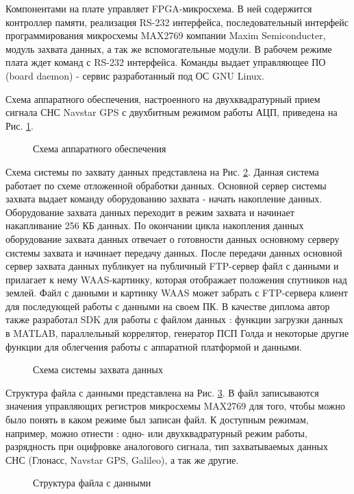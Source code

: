 Компонентами на плате управляет FPGA-микросхема. В ней содержится контроллер памяти, реализация RS-232 интерфейса, последовательный интерфейс программирования микросхемы
MAX2769 компании Maxim Semiconducter, модуль захвата данных, а так же вспомогательные модули. В рабочем режиме плата ждет команд с RS-232 интерфейса.
Команды выдает управляющее ПО (board daemon) - сервис разработанный под ОС GNU Linux.

Схема аппаратного обеспечения, настроенного на двухквадратурный прием сигнала СНС Navstar GPS с двухбитным режимом работы АЦП, приведена на Рис. \ref{pic:board_scheme}.
\begin{figure}[h]
	\center{}
	\caption{Схема аппаратного обеспечения}
	\label{pic:board_scheme}
\end{figure}

Схема системы по захвату данных представлена на Рис. \ref{pic:gps_acq_system_scheme}. Данная система работает по схеме отложенной обработки данных. Основной сервер системы захвата
выдает команду оборудованию захвата - начать накопление данных. Оборудование захвата данных переходит в режим захвата и начинает накапливание 256 КБ данных. По окончании цикла
накопления данных оборудование захвата данных отвечает о готовности данных основному серверу системы захвата и начинает передачу данных. После передачи данных основной сервер
захвата данных публикует на публичный FTP-сервер файл с данными и прилагает к нему WAAS-картинку, которая отображает положения спутников над землей. Файл с данными
и картинку WAAS может забрать с FTP-сервера клиент для последующей работы с данными на своем ПК. В качестве диплома автор также разработал SDK для работы с файлом данных
\cite{github-gpsproject}: функции загрузки данных в MATLAB, параллельный коррелятор, генератор ПСП Голда и некоторые другие функции для облегчения работы с аппаратной платформой
и данными.

\begin{figure}[h]
	\center{}
	\caption{Схема системы захвата данных}
	\label{pic:gps_acq_system_scheme}
\end{figure}

Структура файла с данными представлена на Рис. \ref{pic:dump_file}. В файл записываются значения управляющих регистров микросхемы MAX2769 для того, чтобы можно было
понять в каком режиме был записан файл. К доступным режимам, например, можно отнести \cite{max2769_manual}: одно- или двухквадратурный режим работы, разрядность при оцифровке
аналогового сигнала, тип захватываемых данных СНС (Глонасс, Navstar GPS, Galileo), а так же другие.
\begin{figure}[h]
	\center{}
	\caption{Структура файла с данными}
	\label{pic:dump_file}
\end{figure}

